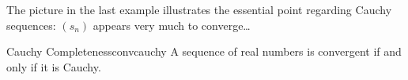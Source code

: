 
The picture in the last example illustrates the essential point regarding Cauchy sequences: $(s_n)$ appears very much to converge\ldots



\goodbreak



\begin{thm}{Cauchy Completeness}{convcauchy}
	A sequence of real numbers is convergent if and only if it is Cauchy.
\end{thm}


